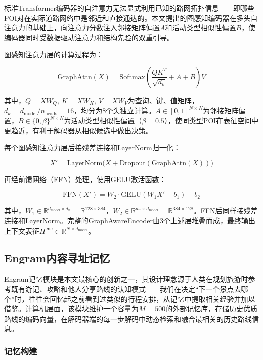 \documentclass[12pt,a4paper]{ctexart}
\begin{document}
标准Transformer编码器的自注意力无法显式利用已知的路网拓扑信息——即哪些POI对在实际道路网络中是邻近和直接通达的。本文提出的图感知编码器在多头自注意力的基础上，向注意力分数注入邻接矩阵偏置$A$和活动类型相似性偏置$B$，使编码器同时受数据驱动注意力和结构先验的双重引导。

图感知注意力层的计算过程为：

\begin{equation}
\text{GraphAttn}(X) = \text{Softmax}\!\left(\frac{QK^T}{\sqrt{d_k}} + A + B\right) V
\label{eq:graph_attn}
\end{equation}

其中，$Q=XW_Q$, $K=XW_K$, $V=XW_V$为查询、键、值矩阵，$d_k=d_{\text{model}}/n_{\text{heads}}=16$，均分为8个头独立计算。$A\in[0,1]^{N\times N}$为邻接矩阵偏置，$B\in\{0,\beta\}^{N\times N}$为活动类型相似性偏置（$\beta=0.5$），使同类型POI在表征空间中更趋近，有利于解码器从相似候选中做出决策。

每个图感知注意力层后接残差连接和LayerNorm归一化：

\begin{equation}
X' = \text{LayerNorm}\bigl(X + \text{Dropout}(\text{GraphAttn}(X))\bigr)
\end{equation}

再经前馈网络（FFN）处理，使用GELU激活函数：

\begin{equation}
\text{FFN}(X') = W_2\cdot\text{GELU}(W_1X'+b_1) + b_2
\end{equation}

其中，$W_1\in\mathbb{R}^{d_{\text{model}}\times d_{\text{ff}}}=\mathbb{R}^{128\times 384}$，$W_2\in\mathbb{R}^{d_{\text{ff}}\times d_{\text{model}}}=\mathbb{R}^{384\times128}$。FFN后同样接残差连接和LayerNorm。完整的GraphAwareEncoder由3个上述层堆叠而成，最终输出上下文表征$H^{\text{enc}}\in\mathbb{R}^{N\times d_{\text{model}}}$。

\subsection{Engram内容寻址记忆}

Engram记忆模块是本文最核心的创新之一，其设计理念源于人类在规划旅游时参考既有游记、攻略和他人分享路线的认知模式——我们在决定“下一个景点去哪个”时，往往会回忆起之前看到过类似的行程安排，从记忆中提取相关经验并加以借鉴。计算机层面，该模块维护一个容量为$M=500$的外部记忆库，存储历史优质路线的编码向量，在解码器端的每一步解码中动态检索和融合最相关的历史路线信息。

\subsubsection{记忆构建}
\end{document}
